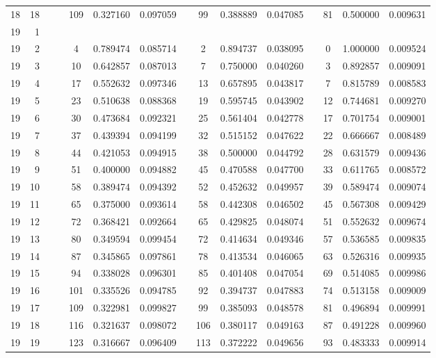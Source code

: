 \begin{appendix}
\begin{longtable}[h]{rrrcccccccccccc}
18	&	18	&&&	109	&	0.327160	&	0.097059	&&	99	&	0.388889	&	0.047085	&&	81	&	0.500000	&	0.009631	\\
19	&	1	&&&		&		&		&&		&		&		&&		&		&		\\
19	&	2	&&&	4	&	0.789474	&	0.085714	&&	2	&	0.894737	&	0.038095	&&	0	&	1.000000	&	0.009524	\\
19	&	3	&&&	10	&	0.642857	&	0.087013	&&	7	&	0.750000	&	0.040260	&&	3	&	0.892857	&	0.009091	\\
19	&	4	&&&	17	&	0.552632	&	0.097346	&&	13	&	0.657895	&	0.043817	&&	7	&	0.815789	&	0.008583	\\
19	&	5	&&&	23	&	0.510638	&	0.088368	&&	19	&	0.595745	&	0.043902	&&	12	&	0.744681	&	0.009270	\\
19	&	6	&&&	30	&	0.473684	&	0.092321	&&	25	&	0.561404	&	0.042778	&&	17	&	0.701754	&	0.009001	\\
19	&	7	&&&	37	&	0.439394	&	0.094199	&&	32	&	0.515152	&	0.047622	&&	22	&	0.666667	&	0.008489	\\
19	&	8	&&&	44	&	0.421053	&	0.094915	&&	38	&	0.500000	&	0.044792	&&	28	&	0.631579	&	0.009436	\\
19	&	9	&&&	51	&	0.400000	&	0.094882	&&	45	&	0.470588	&	0.047700	&&	33	&	0.611765	&	0.008572	\\
19	&	10	&&&	58	&	0.389474	&	0.094392	&&	52	&	0.452632	&	0.049957	&&	39	&	0.589474	&	0.009074	\\
19	&	11	&&&	65	&	0.375000	&	0.093614	&&	58	&	0.442308	&	0.046502	&&	45	&	0.567308	&	0.009429	\\
19	&	12	&&&	72	&	0.368421	&	0.092664	&&	65	&	0.429825	&	0.048074	&&	51	&	0.552632	&	0.009674	\\
19	&	13	&&&	80	&	0.349594	&	0.099454	&&	72	&	0.414634	&	0.049346	&&	57	&	0.536585	&	0.009835	\\
19	&	14	&&&	87	&	0.345865	&	0.097861	&&	78	&	0.413534	&	0.046065	&&	63	&	0.526316	&	0.009935	\\
19	&	15	&&&	94	&	0.338028	&	0.096301	&&	85	&	0.401408	&	0.047054	&&	69	&	0.514085	&	0.009986	\\
19	&	16	&&&	101	&	0.335526	&	0.094785	&&	92	&	0.394737	&	0.047883	&&	74	&	0.513158	&	0.009009	\\
19	&	17	&&&	109	&	0.322981	&	0.099827	&&	99	&	0.385093	&	0.048578	&&	81	&	0.496894	&	0.009991	\\
19	&	18	&&&	116	&	0.321637	&	0.098072	&&	106	&	0.380117	&	0.049163	&&	87	&	0.491228	&	0.009960	\\
19	&	19	&&&	123	&	0.316667	&	0.096409	&&	113	&	0.372222	&	0.049656	&&	93	&	0.483333	&	0.009914	\\

\end{longtable}
\end{appendix}
